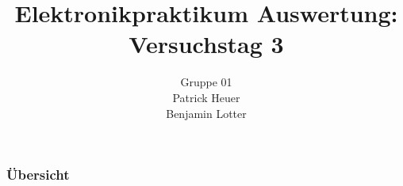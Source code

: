 \documentclass{beamer}
\title{Elektronikpraktikum Auswertung: Versuchstag 3}
\author{Gruppe 01 \\ Patrick Heuer \\ Benjamin Lotter}
\date{}
\begin{document}
\maketitle
\begin{frame}
    \frametitle{Übersicht}
    \tableofcontents
\end{frame}




    
\end{document}
